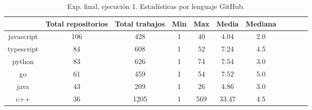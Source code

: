 \begin{table}[h]
  \centering
  \caption{Exp. final, ejecución 1. Estadísticas por lenguaje GitHub.}
  \label{tab:tabla_f1_4}

\begin{footnotesize}
\renewcommand{\arraystretch}{1.5} %
\begin{tabular}{ccccccccccc}
  \hline
  {} &  Total repositorios &  Total trabajos &  Min &  Max &  Media &  Mediana \\
  \hline
  javascript       &        106 &         428 &    1 &   40 &   4.04 &      2.0 \\
  typescript       &         84 &         608 &    1 &   52 &   7.24 &      4.5 \\
  python           &         83 &         626 &    1 &   74 &   7.54 &      3.0 \\
  go               &         61 &         459 &    1 &   54 &   7.52 &      5.0 \\
  java             &         43 &         209 &    1 &   26 &   4.86 &      3.0 \\
  c++              &         36 &        1205 &    1 &  569 &  33.47 &      4.5 \\

\end{tabular}
\end{footnotesize}
\end{table}
